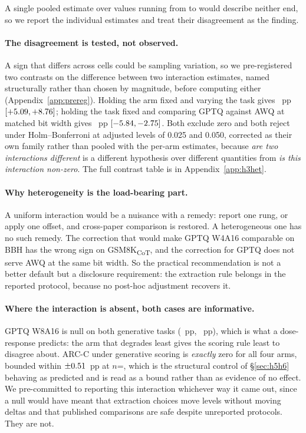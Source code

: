 \documentclass[conference]{IEEEtran}
\begin{document}
A single pooled estimate over values running from \hThreeBbhGptqFour{} to
\hThreeGsmNfFour{} would describe neither end, so we report the individual estimates
and treat their disagreement as the finding.

\paragraph{The disagreement is tested, not observed.}
A sign that differs across cells could be sampling variation, so we
pre-registered two contrasts on the difference between two interaction estimates,
named structurally rather than chosen by magnitude, before computing either
(Appendix~\ref{app:prereg}). Holding the arm fixed and varying the task gives
\hThreeHetTasks{}~pp $[+5.09, +8.76]$; holding the task
fixed and comparing GPTQ against AWQ at matched bit width gives
\hThreeHetArms{}~pp $[-5.84, -2.75]$. Both exclude zero and both
reject under Holm--Bonferroni at adjusted levels of 0.025 and 0.050, corrected as
their own family rather than pooled with the per-arm estimates, because
\emph{are two interactions different} is a different hypothesis over different
quantities from \emph{is this interaction non-zero}. The full contrast table is
in Appendix~\ref{app:h3het}.

\paragraph{Why heterogeneity is the load-bearing part.}
A uniform interaction would be a nuisance with a remedy: report one rung,
or apply one offset, and cross-paper comparison is restored. A heterogeneous one
has no such remedy. The correction that would make GPTQ W4A16 comparable on BBH
has the wrong sign on GSM8K\textsubscript{CoT}, and the correction for GPTQ does
not serve AWQ at the same bit width. So the practical recommendation is not a
better default but a disclosure requirement: the extraction rule belongs in the
reported protocol, because no post-hoc adjustment recovers it.

\paragraph{Where the interaction is absent, both cases are informative.}
GPTQ W8A16 is null on both generative tasks (\hThreeBbhGptqEight{}~pp,
\hThreeGsmGptqEight{}~pp), which is what a dose-response predicts: the arm that
degrades least gives the scoring rule least to disagree about. ARC-C under
generative scoring is \emph{exactly} zero for all four arms, bounded within
$\pm0.51$~pp at $n$=\hThreeArcN, which is the structural control of
\S\ref{sec:h5h6} behaving as predicted and is read as a bound rather than as
evidence of no effect. We pre-committed to reporting this interaction whichever
way it came out, since a null would have meant that extraction choices move
levels without moving deltas and that published comparisons are safe despite
unreported protocols. They are not.
\end{document}
